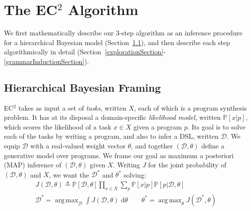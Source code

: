 \documentclass{article}
\newcommand{\system}{\textsc{EC$^2$} }
\DeclareMathOperator*{\argmax}{arg\,max} %
\newcommand{\probability}{\mathds{P}} %
\begin{document}



 \section{The \system Algorithm}
 We first mathematically describe our 3-step algorithm as
 an inference procedure for a hierarchical Bayesian model (Section~\ref{mathematicalFraming}),
  and then describe each step algorithmically in detail (Section~\ref{explorationSection}-\ref{grammarInductionSection}).

 \subsection{Hierarchical Bayesian Framing}\label{mathematicalFraming}

\system takes as input a set of \emph{tasks}, written $X$, each of which is a program synthesis problem.
It has at its disposal a domain-specific \emph{likelihood model}, written $\probability[x|p]$, which scores the likelihood of a task $x\in X$ given a program $p$. %
Its goal is to solve each of the tasks by writing a program,
and also to infer a DSL, written $\mathcal{D}$.
We equip $\mathcal{D}$ with a real-valued weight vector $\theta$, and together
$(\mathcal{D},\theta)$ define a generative model over programs.
We frame our goal as maximum a posteriori (MAP) inference of $(\mathcal{D},\theta)$ given $X$.
Writing $J$ for the joint probability of $(\mathcal{D},\theta)$ and $X$, we want the $\mathcal{D}^*$ and $\theta^*$ solving:
\begin{align}\label{intractableObjectives}
\nonumber  J(\mathcal{D},\theta)\triangleq \probability[\mathcal{D},\theta]\prod_{x\in X} \sum_p \probability[x|p]\probability[p|\mathcal{D},\theta]\\
  \mathcal{D}^* = \argmax_{\mathcal{D}}\int J(\mathcal{D},\theta)\;\mathrm{d}\theta \qquad
  \theta^* =\argmax_\theta J(\mathcal{D}^*,\theta)
\end{align}
\end{document}

